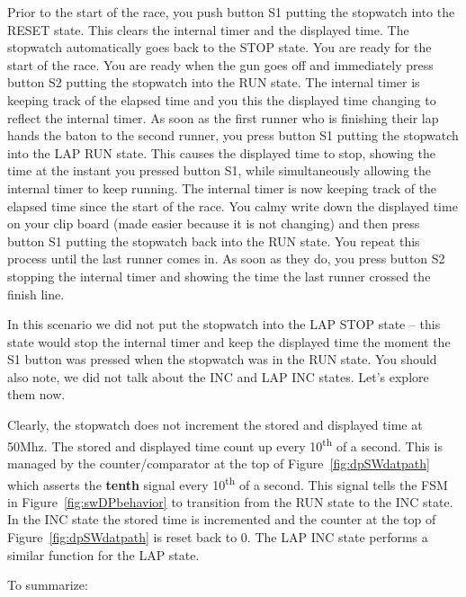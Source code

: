 Prior to the start of the race, you push button S1 putting the stopwatch
into the RESET state. This clears the internal timer and the displayed
time. The stopwatch automatically goes back to the STOP state. You are
ready for the start of the race. You are ready when the gun goes off and
immediately press button S2 putting the stopwatch into the RUN state.
The internal timer is keeping track of the elapsed time and you this the
displayed time changing to reflect the internal timer. As soon as the
first runner who is finishing their lap hands the baton to the second
runner, you press button S1 putting the stopwatch into the LAP RUN
state. This causes the displayed time to stop, showing the time at the
instant you pressed button S1, while simultaneously allowing the
internal timer to keep running. The internal timer is now keeping track
of the elapsed time since the start of the race. You calmy write down
the displayed time on your clip board (made easier because it is not
changing) and then press button S1 putting the stopwatch back into the
RUN state. You repeat this process until the last runner comes in. As
soon as they do, you press button S2 stopping the internal timer and
showing the time the last runner crossed the finish line.

In this scenario we did not put the stopwatch into the LAP STOP state --
this state would stop the internal timer and keep the displayed time the
moment the S1 button was pressed when the stopwatch was in the RUN
state. You should also note, we did not talk about the INC and LAP INC
states. Let's explore them now.

Clearly, the stopwatch does not increment the stored and displayed time
at 50Mhz. The stored and displayed time count up every
10\textsuperscript{th} of a second. This is managed by the
counter/comparator at the top of Figure~\ref{fig:dpSWdatpath} which asserts the
\textbf{tenth} signal every 10\textsuperscript{th} of a second. This
signal tells the FSM in Figure~\ref{fig:swDPbehavior} to transition from the RUN state to the
INC state. In the INC state the stored time is incremented and the
counter at the top of Figure~\ref{fig:dpSWdatpath} is reset back to 0. The LAP INC state
performs a similar function for the LAP state.

To summarize:

